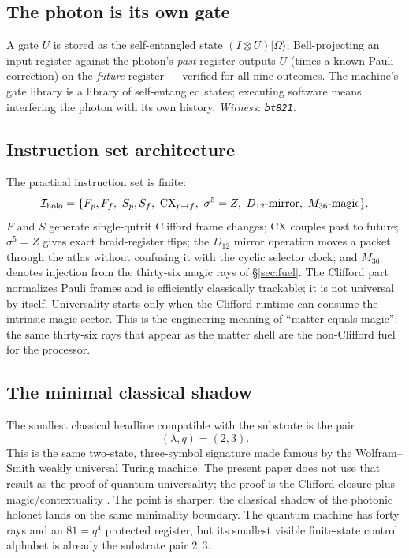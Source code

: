 \documentclass[11pt]{article}
\newcommand{\ket}[1]{|#1\rangle}
\begin{document}
\subsection{The photon is its own gate}
A gate $U$ is stored as the self-entangled state $(I\otimes
U)\ket{\Omega}$; Bell-projecting an input register against the photon's
\emph{past} register outputs $U$ (times a known Pauli correction) on
the \emph{future} register --- verified for all nine outcomes.  The
machine's gate library is a library of self-entangled states; executing
software means interfering the photon with its own history.
\emph{Witness: \texttt{bt821}.}

\subsection{Instruction set architecture}

The practical instruction set is finite:
\[
\mathcal{I}_{\rm holo}=
\{F_p,F_f,\ S_p,S_f,\ \mathrm{CX}_{p\to f},\
\sigma^5=Z,\ D_{12}\hbox{-mirror},\ M_{36}\hbox{-magic}\}.
\]
$F$ and $S$ generate single-qutrit Clifford frame changes; CX couples
past to future; $\sigma^5=Z$ gives exact braid-register flips; the
$D_{12}$ mirror operation moves a packet through the atlas without
confusing it with the cyclic selector clock; and $M_{36}$ denotes
injection from the thirty-six magic rays of \S\ref{sec:fuel}.  The
Clifford part normalizes Pauli frames and is efficiently classically
trackable; it is not universal by itself.  Universality starts only
when the Clifford runtime can consume the intrinsic magic sector.  This
is the engineering meaning of ``matter equals magic'': the same
thirty-six rays that appear as the matter shell are the non-Clifford
fuel for the processor.

\subsection{The minimal classical shadow}

The smallest classical headline compatible with the substrate is the
pair
\[
(\lambda,q)=(2,3).
\]
This is the same two-state, three-symbol signature made famous by the
Wolfram--Smith weakly universal Turing machine.  The present paper does
not use that result as the proof of quantum universality; the proof is
the Clifford closure plus magic/contextuality \cite{wolfram23,smith}.  The point is sharper:
the classical shadow of the photonic holonet lands on the same
minimality boundary.  The quantum machine has forty rays and an
$81=q^4$ protected register, but its smallest visible finite-state
control alphabet is already the substrate pair $2,3$.
\end{document}
